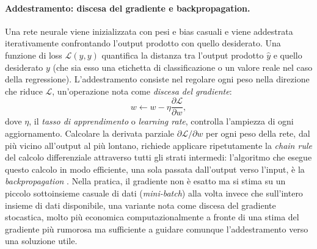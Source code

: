\paragraph{Addestramento: discesa del gradiente e backpropagation.}
Una rete neurale viene inizializzata con pesi e bias casuali e viene addestrata
iterativamente confrontando l'output prodotto con quello desiderato.
Una funzione di loss $\mathcal{L}(\hat y, y)$ quantifica la distanza tra l'output prodotto $\hat y$ e quello desiderato
$y$ (che sia esso una etichetta di classificazione o un valore reale nel caso della regressione).
L'addestramento consiste nel regolare ogni peso nella direzione che riduce $\mathcal{L}$, un'operazione
nota come \emph{discesa del gradiente}:
\[w \leftarrow w - \eta \frac{\partial \mathcal{L}}{\partial w},\]
dove $\eta$, il \emph{tasso di apprendimento} o \emph{learning rate}, controlla l'ampiezza di ogni aggiornamento.
Calcolare la derivata parziale $\partial \mathcal{L}/\partial w$ per ogni peso della rete, dal più vicino
all'output al più lontano, richiede applicare ripetutamente la \emph{chain rule} del calcolo differenziale attraverso tutti gli strati
intermedi: l'algoritmo che esegue questo calcolo in modo efficiente, una
sola passata dall'output verso l'input, è la \emph{backpropagation} \citep{rumelhart1986backprop}.
Nella pratica, il gradiente non è esatto ma si stima su un piccolo sottoinsieme casuale di
dati (\emph{mini-batch}) alla volta invece che sull'intero insieme di
dati disponibile, una variante nota come discesa del gradiente
stocastica, molto più economica computazionalmente a fronte di una stima
del gradiente più rumorosa ma sufficiente a guidare comunque
l'addestramento verso una soluzione utile.

